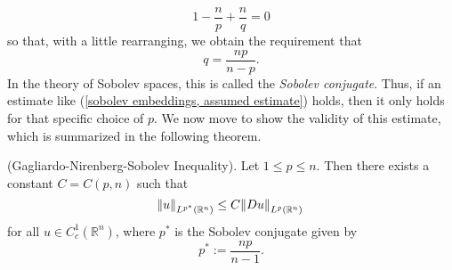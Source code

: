 \documentclass[10pt]{article}
\begin{document}
\begin{equation*}
	\displaystyle 1 - \frac{n}{p} + \frac{n}{q} = 0
\end{equation*}
so that, with a little rearranging, we obtain the requirement that
\begin{equation*}
	\displaystyle q = \frac{np}{n-p}. 
\end{equation*}
In the theory of Sobolev spaces, this is called the \textit{Sobolev conjugate}. Thus, if an estimate like (\ref{sobolev embeddings, assumed estimate}) holds, then it only holds for that specific choice of $p$. We now move to show the validity of this estimate, which is summarized in the following theorem.
\begin{theorem}
	(Gagliardo-Nirenberg-Sobolev Inequality). Let $1 \leq p \leq n$. Then there exists a constant $C = C(p, n)$ such that
	\begin{equation*}
		\displaystyle \norm{u}_{L^{p^*}(\mathbb{R}^n)} \leq C\norm{Du}_{L^p(\mathbb{R}^n)}
	\end{equation*}
	for all $u \in C^1_c(\mathbb{R}^n)$, where $p^*$ is the Sobolev conjugate given by 
	\begin{equation*}
		\displaystyle p^* := \frac{np}{n-1}.
	\end{equation*} 
\end{theorem}
\end{document}
